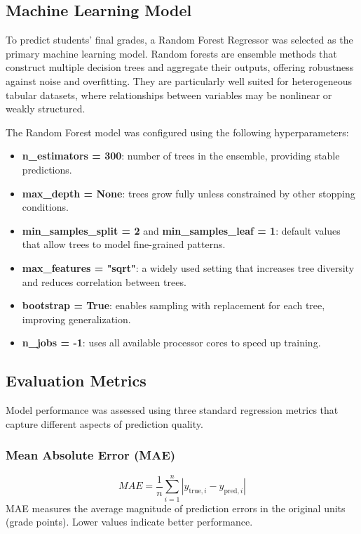 \documentclass{IEEEmce}
\begin{document}
\subsection{Machine Learning Model}

To predict students’ final grades, a Random Forest Regressor was selected as the primary machine learning model. Random forests are ensemble methods that construct multiple decision trees and aggregate their outputs, offering robustness against noise and overfitting. They are particularly well suited for heterogeneous tabular datasets, where relationships between variables may be nonlinear or weakly structured.

The Random Forest model was configured using the following hyperparameters:

\begin{itemize}
    \item \textbf{n\_estimators = 300}: number of trees in the ensemble, providing stable predictions.
    \item \textbf{max\_depth = None}: trees grow fully unless constrained by other stopping conditions.
    \item \textbf{min\_samples\_split = 2} and \textbf{min\_samples\_leaf = 1}: default values that allow trees to model fine-grained patterns.
    \item \textbf{max\_features = "sqrt"}: a widely used setting that increases tree diversity and reduces correlation between trees.
    \item \textbf{bootstrap = True}: enables sampling with replacement for each tree, improving generalization.
    \item \textbf{n\_jobs = -1}: uses all available processor cores to speed up training.
\end{itemize}

\subsection{Evaluation Metrics}

Model performance was assessed using three standard regression metrics that capture different aspects of prediction quality.

\subsubsection{Mean Absolute Error (MAE)}
\begin{equation}
    MAE = \frac{1}{n} \sum_{i=1}^{n} \left| y_{\text{true},i} - y_{\text{pred},i} \right|
\end{equation}
MAE measures the average magnitude of prediction errors in the original units (grade points). 
Lower values indicate better performance.
\end{document}
